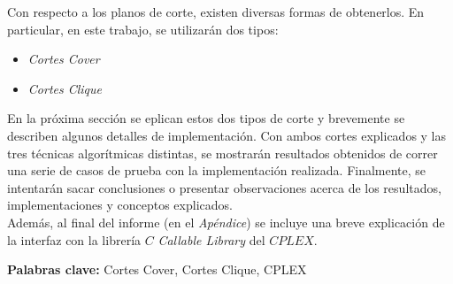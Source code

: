 Con respecto a los planos de corte, existen diversas formas de obtenerlos. En particular, en este trabajo, se utilizarán dos tipos:

\begin{itemize}
\item \emph{Cortes Cover}
\item \emph{Cortes Clique}
\end{itemize}

En la próxima sección se eplican estos dos tipos de corte y brevemente se describen algunos detalles de implementación. Con ambos cortes explicados y las tres técnicas algorítmicas distintas, se mostrarán resultados obtenidos de correr una serie de casos de prueba con la implementación realizada. Finalmente, se intentarán sacar conclusiones o presentar observaciones acerca de los resultados, implementaciones y conceptos explicados.\\

Además, al final del informe (en el \emph{Apéndice}) se incluye una breve explicación de la interfaz con la librería $C$ \emph{Callable Library} del $CPLEX$.

\textbf{Palabras clave:} Cortes Cover, Cortes Clique, CPLEX
